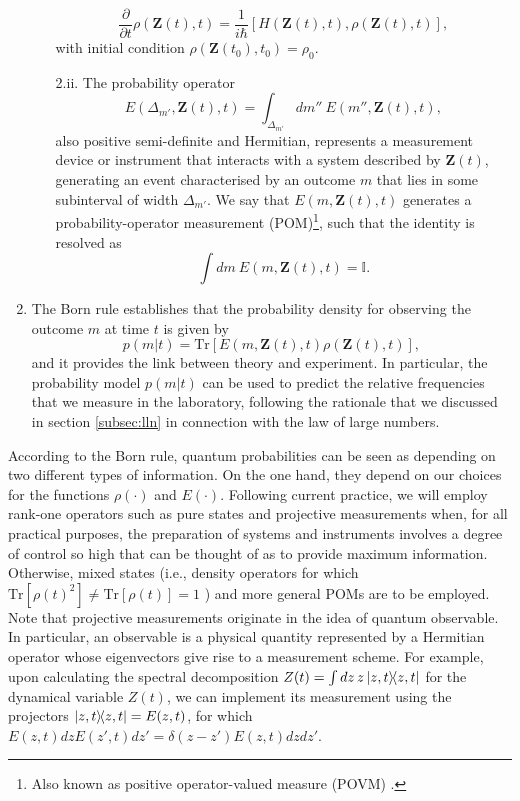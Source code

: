 \begin{enumerate}
\begin{enumerate}
\begin{equation}
\frac{\partial}{\partial t}\rho(\boldsymbol{Z}(t), t) =  \frac{1}{i\hbar} \left[H(\boldsymbol{Z}(t), t), \rho(\boldsymbol{Z}(t), t)\right],
\label{vonneumann}
\end{equation}
with initial condition $\rho(\boldsymbol{Z}(t_0), t_0) = \rho_0$.
\item[2.ii.] The probability operator
\begin{equation}
E(\Delta_{m'}, \boldsymbol{Z}(t), t) = \int_{\Delta_{m'}} dm''~E(m'', \boldsymbol{Z}(t), t),
\end{equation}
also positive semi-definite and Hermitian, represents a measurement device or instrument \cite{helstrom1976} that interacts with a system described by $\boldsymbol{Z}(t)$, generating an event characterised by an outcome $m$ that lies in some subinterval of width $\Delta_{m'}$. We say that $E(m, \boldsymbol{Z}(t), t)$ generates a probability-operator measurement (POM)\footnote{Also known as positive operator-valued measure (POVM) \cite{englert2013, jiangwei2014, barnett2014}.}, such that the identity is resolved as
\begin{equation}
\int dm~E(m, \boldsymbol{Z}(t), t) = \mathbb{I}.
\end{equation}
\end{enumerate}
\item The Born rule establishes that the probability density for observing the outcome $m$ at time $t$ is given by
\begin{equation}
p(m|t) = \mathrm{Tr}\left[E(m, \boldsymbol{Z}(t), t) \rho(\boldsymbol{Z}(t), t) \right],
\label{bornrule}
\end{equation}
and it provides the link between theory and experiment. In particular, the probability model $p(m|t)$ can be used to predict the relative frequencies that we measure in the laboratory, following the rationale that we discussed in section \ref{subsec:lln} in connection with the law of large numbers.
\end{enumerate}

According to the Born rule, quantum probabilities can be seen as depending on two different types of information. On the one hand, they depend on our choices for the functions $\rho(\cdot)$ and $E(\cdot)$. Following current practice, we will employ rank-one operators such as pure states and projective measurements when, for all practical purposes, the preparation of systems and instruments involves a degree of control so high that can be thought of as to provide maximum information. Otherwise, mixed states (i.e., density operators for which $\mathrm{Tr}[\rho(t)^2]\neq \mathrm{Tr}[\rho(t)] = 1$ \cite{breuer2002}) and more general POMs are to be employed. Note that projective measurements originate in the idea of quantum observable. In particular, an observable is a physical quantity represented by a Hermitian operator whose eigenvectors give rise to a measurement scheme. For example, upon calculating the spectral decomposition $Z(t) = \int dz\,z \ketbra{z,t}$ for the dynamical variable $Z(t)$, we can implement its measurement using the projectors $\ketbra{z,t} = E(z,t)$, for which $ E(z,t)dz E(z',t) dz' = \delta(z - z')E(z, t)dz dz' $. 
 
